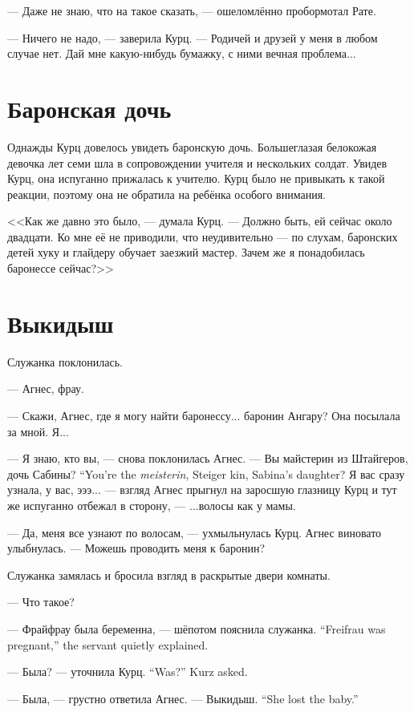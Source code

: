 --- Даже не знаю, что на такое сказать, --- ошеломлённо пробормотал Рате.

--- Ничего не надо, --- заверила Курц.
--- Родичей и друзей у меня в любом случае нет.
Дай мне какую-нибудь бумажку, с ними вечная проблема...

\section{Баронская дочь}

Однажды Курц довелось увидеть баронскую дочь.
Большеглазая белокожая девочка лет семи шла в сопровождении учителя и нескольких солдат.
Увидев Курц, она испуганно прижалась к учителю.
Курц было не привыкать к такой реакции, поэтому она не обратила на ребёнка особого внимания.

<<Как же давно это было, --- думала Курц.
--- Должно быть, ей сейчас около двадцати.
Ко мне её не приводили, что неудивительно --- по слухам, баронских детей хуку и глайдеру обучает заезжий мастер.
Зачем же я понадобилась баронессе сейчас?>>

\section{Выкидыш}

Служанка поклонилась.

--- Агнес, фрау.

--- Скажи, Агнес, где я могу найти баронессу... баронин Ангару?
Она посылала за мной.
Я...

--- Я знаю, кто вы, --- снова поклонилась Агнес.
{--- Вы майстерин из Штайгеров, дочь Сабины?}
{``You're the \textit{meisterin}, Steiger kin, Sabina's daughter?}
Я вас сразу узнала, у вас, эээ... --- взгляд Агнес прыгнул на заросшую глазницу Курц и тут же испуганно отбежал в сторону, --- ...волосы как у мамы.

--- Да, меня все узнают по волосам, --- ухмыльнулась Курц.
Агнес виновато улыбнулась.
--- Можешь проводить меня к баронин?

Служанка замялась и бросила взгляд в раскрытые двери комнаты.

--- Что такое?

{--- Фрайфрау была беременна, --- шёпотом пояснила служанка.}
{``Freifrau was pregnant,'' the servant quietly explained.}

{--- Была? --- уточнила Курц.}
{``Was?'' Kurz asked.}

--- Была, --- грустно ответила Агнес.
{--- Выкидыш.}
{``She lost the baby.''}

